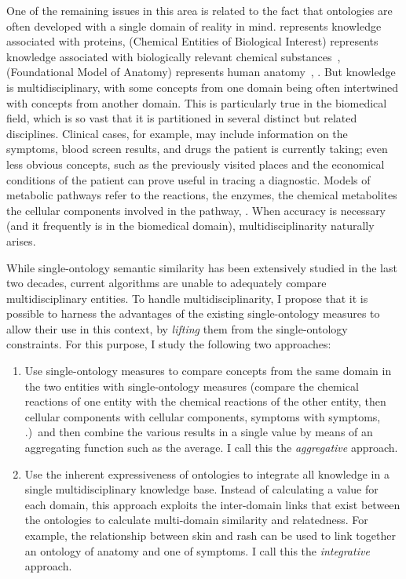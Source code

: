 One of the remaining issues in this area is related to the fact that ontologies are often developed with a single domain of reality in mind.  represents knowledge associated with proteins,  (Chemical Entities of Biological Interest) represents knowledge associated with biologically relevant chemical substances~\citep{Degtyarenko2008a},  (Foundational Model of Anatomy) represents human anatomy~\citep{Rosse2003}, \etc. But knowledge is multidisciplinary, with some concepts from one domain being often intertwined with concepts from another domain. This is particularly true in the biomedical field, which is so vast that it is partitioned in several distinct but related disciplines. Clinical cases, for example, may include information on the symptoms, blood screen results, and drugs the patient is currently taking; even less obvious concepts, such as the previously visited places and the economical conditions of the patient can prove useful in tracing a diagnostic. Models of metabolic pathways refer to the reactions, the enzymes, the chemical metabolites the cellular components involved in the pathway, \etc. When accuracy is necessary (and it frequently is in the biomedical domain), multidisciplinarity naturally arises.

While single-ontology semantic similarity has been extensively studied in the last two decades, current algorithms are unable to adequately compare multidisciplinary entities. To handle multidisciplinarity, I propose that it is possible to harness the advantages of the existing single-ontology measures to allow their use in this context, by \emph{lifting} them from the single-ontology constraints. For this purpose, I study the following two approaches:
\begin{enumerate}
    \item Use single-ontology measures to compare concepts from the same domain in the two entities with single-ontology measures (\ie compare the chemical reactions of one entity with the chemical reactions of the other entity, then cellular components with cellular components, symptoms with symptoms, \etc.)\ and then combine the various results in a single value by means of an aggregating function such as the average. I call this the \emph{aggregative} approach.
    \item Use the inherent expressiveness of ontologies to integrate all knowledge in a single multidisciplinary knowledge base. Instead of calculating a value for each domain, this approach exploits the inter-domain links that exist between the ontologies to calculate multi-domain similarity and relatedness. For example, the relationship between skin and rash can be used to link together an ontology of anatomy and one of symptoms. I call this the \emph{integrative} approach.
\end{enumerate}


